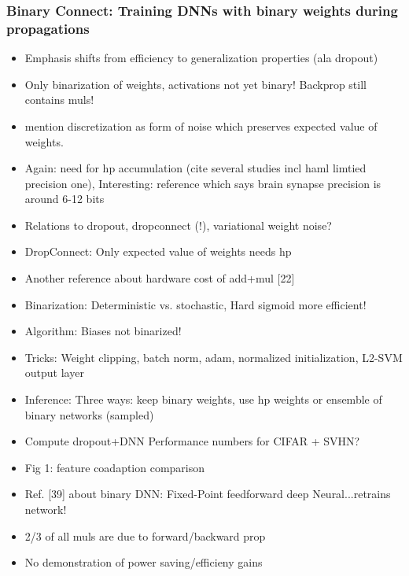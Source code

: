 \documentclass{article}
\begin{document}
\subsubsection*{Binary Connect: Training DNNs with binary weights during propagations}
    \begin{itemize}
    \item Emphasis shifts from efficiency to generalization properties (ala dropout)
    \item Only binarization of weights, activations not yet binary! Backprop still contains muls!
    \item mention discretization as form of noise which preserves expected value of weights.
    \item Again: need for hp accumulation (cite several studies incl haml limtied
    precision one), Interesting: reference which says brain synapse precision is
    around 6-12 bits
    \item Relations to dropout, dropconnect (!), variational weight noise?
    \item DropConnect: Only expected value of weights needs hp
    \item Another reference about hardware cost of add+mul [22]
    \item Binarization: Deterministic vs. stochastic, Hard sigmoid more efficient!
    \item Algorithm: Biases not binarized!
    \item Tricks: Weight clipping, batch norm, adam, normalized initialization,
    L2-SVM output layer
    \item Inference: Three ways: keep binary weights, use hp weights or ensemble of
    binary networks (sampled)
    \item Compute dropout+DNN Performance numbers for CIFAR + SVHN?
    \item Fig 1: feature coadaption comparison
    \item Ref. [39] about binary DNN: Fixed-Point feedforward deep Neural...retrains network!
    \item 2/3 of all muls are due to forward/backward prop
    \item No demonstration of power saving/efficieny gains
    \end{itemize}
\end{document}
